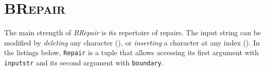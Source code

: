 \documentclass[sigconf,review,anonymous]{acmart}
\makeatletter
\def\<#1>{\texttt{#1}}
\newcommand{\approach}{\textsc{BRepair}\xspace}
\newcommand{\brepair}{\textit{BRepair}\xspace}
\newcommand\letterboxed[1]{%
\setlength{\fboxsep}{0pt}%
  \@tfor\@ii:=#1\do{%
    \fcolorbox{white}{light-gray}{\texttt{\strut\@ii}}%
  }%
}
\makeatother
\begin{document}
%

\section{\approach}
\label{sec:brepair}
The main strength of \brepair is its repertoire of repairs.
The input string can be modified by \emph{deleting} any character
(), or
\emph{inserting} a character at any index ().
In the listings below, \<Repair> is a tuple that allows
accessing its first argument with \<inputstr> and its second argument with
\<boundary>.
\end{document}
